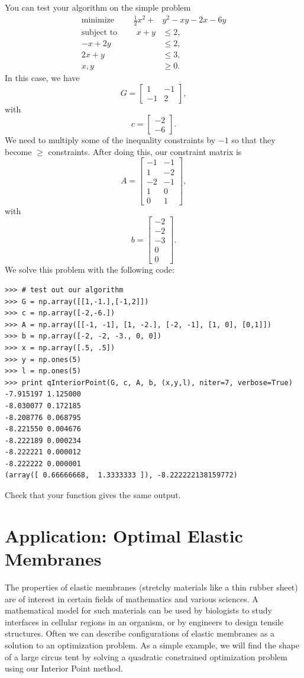 You can test your algorithm on the simple problem
\begin{align*}
\text{minimize }\qquad \frac{1}{2}x^2 + &y^2 - xy - 2x - 6y\\
\text{subject to }\qquad x+y &\leq 2,\\
-x+2y &\leq 2,\\
2x+y&\leq 3,\\
x, y &\geq 0.
\end{align*}
In this case, we have
\[
G = \begin{bmatrix}
1 & -1\\
-1 & 2
\end{bmatrix},
\]
with
\[
c = \begin{bmatrix}
-2\\
-6
\end{bmatrix}.
\]
We need to multiply some of the inequality constraints by $-1$ so that they become $\geq$ constraints.
After doing this, our constraint matrix is
\[
A = \begin{bmatrix}
-1 & -1\\
1 & -2\\
-2 & -1\\
1 & 0\\
0 & 1
\end{bmatrix},
\]
with
\[
b = \begin{bmatrix}
-2\\
-2\\
-3\\
0\\
0
\end{bmatrix}.
\]
We solve this problem with the following code:
\begin{lstlisting}
>>> # test out our algorithm
>>> G = np.array([[1,-1.],[-1,2]])
>>> c = np.array([-2,-6.])
>>> A = np.array([[-1, -1], [1, -2.], [-2, -1], [1, 0], [0,1]])
>>> b = np.array([-2, -2, -3., 0, 0])
>>> x = np.array([.5, .5])
>>> y = np.ones(5)
>>> l = np.ones(5)
>>> print qInteriorPoint(G, c, A, b, (x,y,l), niter=7, verbose=True)
-7.915197 1.125000
-8.030077 0.172185
-8.208776 0.068795
-8.221550 0.004676
-8.222189 0.000234
-8.222221 0.000012
-8.222222 0.000001
(array([ 0.66666668,  1.3333333 ]), -8.222222138159772)
\end{lstlisting}
Check that your function gives the same output.

\section*{Application: Optimal Elastic Membranes}
The properties of elastic membranes (stretchy materials like a thin rubber sheet) are of interest in
certain fields of mathematics and various sciences. A mathematical model for
such materials can be used by biologists to study interfaces in cellular regions in an organism, or by engineers
to design tensile structures. Often we can describe configurations of elastic membranes as a solution to an
optimization problem. As a simple example, we will find the shape of a large circus tent by solving a quadratic
constrained optimization problem using our Interior Point method.

